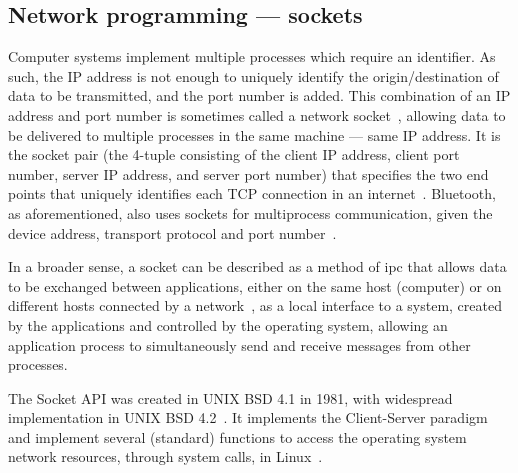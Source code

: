 \subsection{Network programming --- sockets}%
\label{sec:netw-progr-sock}
Computer systems implement multiple processes which require an identifier. As
such, the IP address is not enough to uniquely identify the origin/destination
of data to be transmitted, and the port number is added. This combination of an
IP address and port number is sometimes called a network socket~\cite{wright1995tcp}, allowing
data to be delivered to multiple processes in the same machine --- same IP
address.
It is the socket pair (the 4-tuple consisting of the client IP address, client
port number, server IP address, and server port number) that specifies the two
end points that uniquely identifies each TCP connection in an
internet~\cite{wright1995tcp}. Bluetooth, as aforementioned, also uses sockets
for multiprocess communication, given the device address, transport protocol and
port number~\cite{huang2007bluetooth}.

In a broader sense, a socket can be described as a method of \gls{ipc} that allows data to be exchanged between applications, either on
the same host (computer) or on different hosts connected by a network~\cite{kerrisk2010linux}, as a
local interface to a system, created by the applications and controlled by the
operating system, allowing an application process to simultaneously send and
receive messages from other processes.

The Socket API was created in UNIX BSD 4.1 in 1981, with widespread
implementation in UNIX BSD 4.2~\cite{kerrisk2010linux}. It implements the Client-Server paradigm and
implement several (standard) functions to access the operating system network
resources, through system calls, in Linux~\cite{kerrisk2010linux}.

